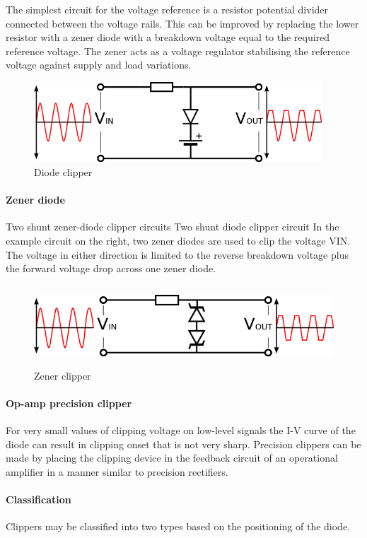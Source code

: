 \documentclass{article}
\begin{document}
The simplest circuit for the voltage reference is a resistor potential divider connected between the voltage rails. This can be improved by replacing the lower resistor with a zener diode with a breakdown voltage equal to the required reference voltage. The zener acts as a voltage regulator stabilising the reference voltage against supply and load variations.
\begin{figure}[H]
		\includegraphics[height=3cm]{660px-Diode_Voltage_Clipper.svg.png}
		\caption{Diode clipper}
	\end{figure}

\paragraph{\large Zener diode\\} 
Two shunt zener-diode clipper circuits
Two shunt diode clipper circuit
In the example circuit on the right, two zener diodes are used to clip the voltage VIN. The voltage in either direction is limited to the reverse breakdown voltage plus the forward voltage drop across one zener diode.
\begin{figure}[H]
		\includegraphics[height=3cm]{660px-Zener_Diode.svg.png}
		\caption{Zener clipper}
	\end{figure}

\paragraph{\large Op-amp precision clipper\\} 
For very small values of clipping voltage on low-level signals the I-V curve of the diode can result in clipping onset that is not very sharp. Precision clippers can be made by placing the clipping device in the feedback circuit of an operational amplifier in a manner similar to precision rectifiers.
\paragraph{\huge Classification\\}
Clippers may be classified into two types based on the positioning of the diode. 
\end{document}
